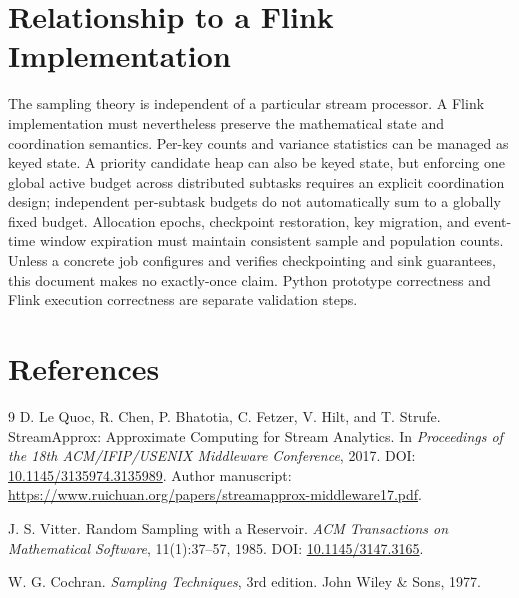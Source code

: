 \documentclass[11pt]{article}
\begin{document}
\section{Relationship to a Flink Implementation}

The sampling theory is independent of a particular stream processor. A Flink implementation must nevertheless preserve the mathematical state and coordination semantics. Per-key counts and variance statistics can be managed as keyed state. A priority candidate heap can also be keyed state, but enforcing one global active budget across distributed subtasks requires an explicit coordination design; independent per-subtask budgets do not automatically sum to a globally fixed budget. Allocation epochs, checkpoint restoration, key migration, and event-time window expiration must maintain consistent sample and population counts. Unless a concrete job configures and verifies checkpointing and sink guarantees, this document makes no exactly-once claim. Python prototype correctness and Flink execution correctness are separate validation steps.

\section{References}

\begin{thebibliography}{9}
D. Le Quoc, R. Chen, P. Bhatotia, C. Fetzer, V. Hilt, and T. Strufe.
\newblock StreamApprox: Approximate Computing for Stream Analytics.
\newblock In \emph{Proceedings of the 18th ACM/IFIP/USENIX Middleware Conference}, 2017.
\newblock DOI: \href{https://doi.org/10.1145/3135974.3135989}{10.1145/3135974.3135989}.
\newblock Author manuscript: \url{https://www.ruichuan.org/papers/streamapprox-middleware17.pdf}.

J. S. Vitter.
\newblock Random Sampling with a Reservoir.
\newblock \emph{ACM Transactions on Mathematical Software}, 11(1):37--57, 1985.
\newblock DOI: \href{https://doi.org/10.1145/3147.3165}{10.1145/3147.3165}.

W. G. Cochran.
\newblock \emph{Sampling Techniques}, 3rd edition.
\newblock John Wiley \& Sons, 1977.
\end{thebibliography}
\end{document}
